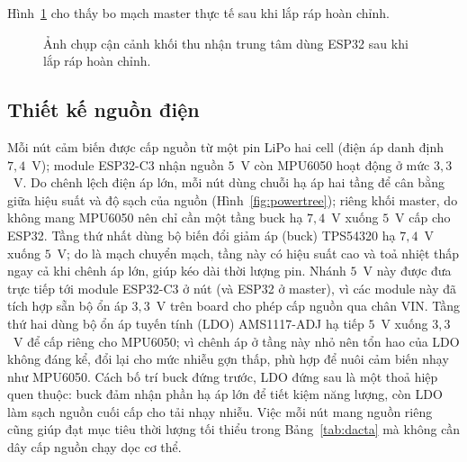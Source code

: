 \documentclass[../DoAn.tex]{subfiles}
\begin{document}
Hình~\ref{fig:masterphoto} cho thấy bo mạch master thực tế sau khi lắp ráp hoàn
chỉnh.

\begin{figure}[h]
    \centering
    \caption{Ảnh chụp cận cảnh khối thu nhận trung tâm dùng ESP32 sau khi lắp ráp hoàn chỉnh.}
    \label{fig:masterphoto}
\end{figure}

\subsection{Thiết kế nguồn điện}
\label{subsec:hw_nguon}
Mỗi nút cảm biến được cấp nguồn từ một pin LiPo hai cell (điện áp danh định $7{,}4$~V); module ESP32-C3 nhận nguồn $5$~V còn MPU6050 hoạt động ở mức $3{,}3$~V. Do chênh lệch điện áp lớn, mỗi nút dùng chuỗi hạ áp hai tầng để cân bằng giữa hiệu suất và độ sạch của nguồn (Hình~\ref{fig:powertree}); riêng khối master, do không mang MPU6050 nên chỉ cần một tầng buck hạ $7{,}4$~V xuống $5$~V cấp cho ESP32. Tầng thứ nhất dùng bộ biến đổi giảm áp (buck) TPS54320 hạ
$7{,}4$~V xuống $5$~V; do là mạch chuyển mạch, tầng này có hiệu suất cao và toả
nhiệt thấp ngay cả khi chênh áp lớn, giúp kéo dài thời lượng pin. Nhánh $5$~V này
được đưa trực tiếp tới module ESP32-C3 ở nút (và ESP32 ở master), vì các module
này đã tích hợp sẵn bộ ổn áp $3{,}3$~V trên board cho phép cấp nguồn qua chân VIN.
Tầng thứ hai dùng bộ ổn áp tuyến tính (LDO) AMS1117-ADJ hạ tiếp $5$~V xuống
$3{,}3$~V để cấp riêng cho MPU6050; vì chênh áp ở tầng này nhỏ nên tổn hao của LDO
không đáng kể, đổi lại cho mức nhiễu gợn thấp, phù hợp để nuôi cảm biến nhạy
như MPU6050. Cách bố trí buck đứng trước, LDO
đứng sau là một thoả hiệp quen thuộc: buck đảm nhận phần hạ áp lớn để tiết kiệm
năng lượng, còn LDO làm sạch nguồn cuối cấp cho tải nhạy nhiễu. Việc mỗi nút mang
nguồn riêng cũng giúp đạt mục tiêu thời lượng tối thiểu trong Bảng~\ref{tab:dacta}
mà không cần dây cấp nguồn chạy dọc cơ thể.
\end{document}
